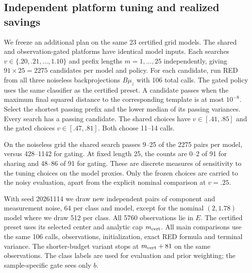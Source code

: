 \subsection{Independent platform tuning and realized savings}
We freeze an additional plan on the same 23 certified grid
models. The shared and observation-gated platforms have
identical model inputs. Each searches
$v\in\{.20,.21,\ldots,1.10\}$ and prefix lengths $m=1,\ldots,25$
independently, giving $91\times25=2275$ candidates per
model and policy. For each candidate, run RED from all
three noiseless backprojections $B\mu_z$ with 106 total calls.
The gated policy uses the same classifier as the certified
preset. A candidate passes when the maximum final squared
distance to the corresponding template is at most $10^{-8}$.
Select the shortest passing prefix and the lower median
of its passing variances. Every search has a passing
candidate. The shared choices have $v\in[.41,.85]$ and
the gated choices $v\in[.47,.81]$. Both choose 11--14 calls.

On the noiseless grid the shared search passes 9--25
of the 2275 pairs per model, versus 428--1142 for gating.
At fixed length 25, the counts are 0--2 of 91 for sharing
and 48--86 of 91 for gating. These are discrete measures
of sensitivity to the tuning choices on the model proxies.
Only the frozen choices are carried to the noisy evaluation,
apart from the explicit nominal comparison at $v=.25$.

With seed 20261114 we draw new independent pairs of component
and measurement noise, 64 per class and model, except for the
nominal $(2,1.78)$ model where we draw 512 per class.
All 5760 observations lie in $E$. The certified preset
uses its selected center and analytic cap $m_{\rm cert}$.
All main comparisons use the same 106 calls, observations,
initialization, exact RED formula and terminal variance.
The shorter-budget variant stops at $m_{\rm cert}+81$ on the
same observations. The class labels are used for evaluation
and prior weighting; the sample-specific gate sees only $b$.

